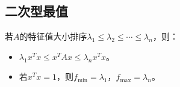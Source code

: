 \paragraph{}

\subsection{二次型最值}

若$A$的特征值大小排序$\lambda_1\leqslant\lambda_2\leqslant\cdots\leqslant\lambda_n$，则：

\begin{itemize}
    \item $\lambda_1x^Tx\leqslant x^TAx\leqslant\lambda_nx^Tx$。
    \item 若$x^Tx=1$，则$f_{\min}=\lambda_1$，$f_{\max}=\lambda_n$。
\end{itemize}